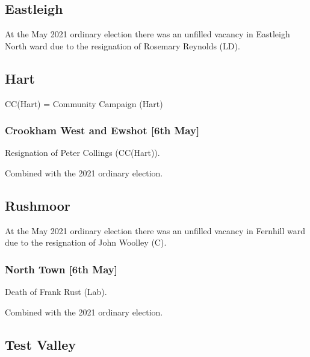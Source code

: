 \documentclass[a4paper,openany]{book}
\begin{document}
\begin{resultsiii}
\subsection*{Eastleigh}

At the May 2021 ordinary election there was an unfilled vacancy in Eastleigh North ward due to the resignation of Rosemary Reynolds (LD).

\subsection*{Hart}

CC(Hart) = Community Campaign (Hart)

\subsubsection*{Crookham West and Ewshot \hspace*{\fill}\nolinebreak[1]%
	\enspace\hspace*{\fill}
	[6th May]}


Resignation of Peter Collings (CC(Hart)).

Combined with the 2021 ordinary election.

\subsection*{Rushmoor}

At the May 2021 ordinary election there was an unfilled vacancy in Fernhill ward due to the resignation of John Woolley (C).

\subsubsection*{North Town \hspace*{\fill}\nolinebreak[1]%
	\enspace\hspace*{\fill}
	[6th May]}


Death of Frank Rust (Lab).

Combined with the 2021 ordinary election.

\subsection*{Test Valley}


\end{resultsiii}
\end{document}
